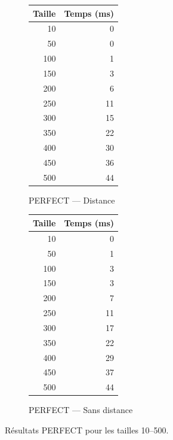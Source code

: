 \documentclass{butexFR}
\begin{document}
\begin{figure}[H]
    \centering

    \begin{subfigure}{0.45\textwidth}
        \centering
        \begin{tabular}{|r|r|}
            \hline
            Taille & Temps (ms) \\
            \hline
            10  & 0 \\
            50  & 0 \\
            100 & 1 \\
            150 & 3 \\
            200 & 6 \\
            250 & 11 \\
            300 & 15 \\
            350 & 22 \\
            400 & 30 \\
            450 & 36 \\
            500 & 44 \\
            \hline
        \end{tabular}
        \caption{PERFECT — Distance}
    \end{subfigure}
    \hfill
    \begin{subfigure}{0.45\textwidth}
        \centering
        \begin{tabular}{|r|r|}
            \hline
            Taille & Temps (ms) \\
            \hline
            10  & 0 \\
            50  & 1 \\
            100 & 3 \\
            150 & 3 \\
            200 & 7 \\
            250 & 11 \\
            300 & 17 \\
            350 & 22 \\
            400 & 29 \\
            450 & 37 \\
            500 & 44 \\
            \hline
        \end{tabular}
        \caption{PERFECT — Sans distance}
    \end{subfigure}

    \caption{Résultats PERFECT pour les tailles 10–500.}
\end{figure}
\end{document}
